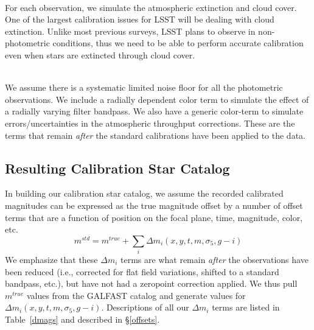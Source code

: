 \documentclass[12pt,preprint]{aastex}
\begin{document}
\\
For each observation, we simulate the atmospheric extinction and cloud cover.  One of the largest calibration issues for LSST will be dealing with cloud extinction.  Unlike most previous surveys, LSST plans to observe in non-photometric conditions, thus we need to be able to perform accurate calibration even when stars are extincted through cloud cover.  



\\
We assume there is a systematic limited noise floor for all the photometric observations.  We include a radially dependent color term to simulate the effect of a radially varying filter bandpass.  We also have a generic color-term to simulate errors/uncertainties in the atmospheric throughput corrections.  These are the terms that remain {\emph{after}} the standard calibrations have been applied to the data. 


\subsection{Resulting Calibration Star Catalog}


In building our calibration star catalog, we assume the recorded calibrated magnitudes can be expressed as the true magnitude offset by a number of offset terms that are a function of position on the focal plane, time, magnitude, color, etc.
\begin{equation}
m^{std}=m^{true}+\sum_i\Delta m_i(x,y,t,m,\sigma_5, g-i)
\end{equation}
We emphasize that these $\Delta m_i$ terms are what remain {\emph{after}} the observations have been reduced (i.e., corrected for flat field variations, shifted to a standard bandpass, etc.), but have not had a zeropoint correction applied.  We thus pull $m^{true}$ values from the GALFAST catalog and generate values for $\Delta m_i(x,y,t,m,\sigma_5, g-i)$.  Descriptions of all our $\Delta m_i$ terms are listed in Table~\ref{dmags} and described in \S\ref{offsets}.  
\end{document}
